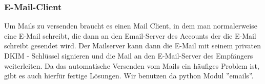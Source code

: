 \subsubsection{E-Mail-Client}
Um Mails zu versenden braucht es einen Mail Client, in dem man normalerweise eine E-Mail schreibt, die dann 
an den Email-Server des Accounts der die E-Mail schreibt gesendet wird. Der Mailserver kann dann die E-Mail mit 
seinem privaten DKIM - Schlüssel signieren und die Mail an den E-Mail-Server des Empfängers weiterleiten. Da das automatische Versenden vom Mails ein häufiges Problem ist, gibt es auch hierfür fertige Lösungen. Wir benutzen da python
 Modul ''emails''.
